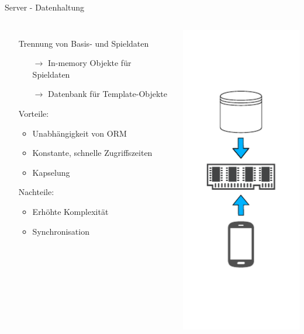 \begin{frame}{Server - Datenhaltung}
	\begin{columns}
			\begin{itemize}
				\itemsep 12pt
				\item[] Trennung von Basis- und Spieldaten
				\begin{itemize}
					\itemsep 2pt
					\item[$\rightarrow$] In-memory Objekte für Spieldaten
					\item[$\rightarrow$] Datenbank für Template-Objekte   
				\end{itemize}
				\item[] Vorteile:
				\begin{itemize}
					\itemsep 2pt
					\item Unabhängigkeit von ORM
					\item Konstante, schnelle Zugriffszeiten
					\item Kapselung
				\end{itemize}
				\item[] Nachteile:
				\begin{itemize}
					\itemsep 2pt
					\item Erhöhte Komplexität
					\item Synchronisation
				\end{itemize}
			\end{itemize}
			\includegraphics[height=\textheight]{images/server/datenhaltung.pdf}
	\end{columns} 
\end{frame}


